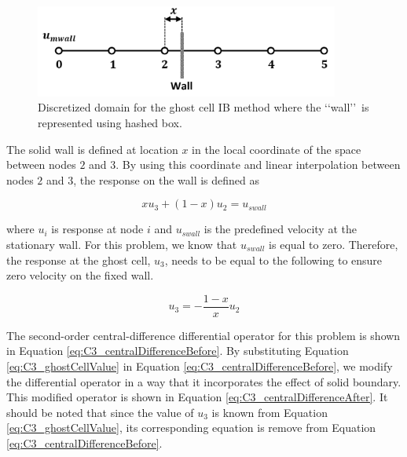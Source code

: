 \begin{figure}[H]
	\centering
	\includegraphics[width=10.00cm]{Chapter_3/figure/ghost_cell_discretization.png}
	\caption{Discretized domain for the ghost cell IB method where the \lq\lq wall\rq\rq\ is represented using hashed box.}
	\label{fig:C3_discretizedGhostCell}
\end{figure}

The solid wall is defined at location $x$ in the local coordinate of the space between nodes $2$ and $3$. By using this coordinate and linear interpolation between nodes $2$ and $3$, the response on the wall is defined as

\begin{equation}
	x u_3 + (1 - x) u_2 = u_{swall}
\end{equation}

where $u_i$ is response at node $i$ and $u_{swall}$ is the predefined velocity at the stationary wall. For this problem, we know that $u_{swall}$ is equal to zero. Therefore, the response at the ghost cell, $u_3$, needs to be equal to the following to ensure zero velocity on the fixed wall.

\begin{equation}\label{eq:C3_ghostCellValue}
	u_3 = -\frac{1 - x}{x} u_2
\end{equation}

The second-order central-difference differential operator for this problem is shown in Equation \eqref{eq:C3_centralDifferenceBefore}. By substituting Equation \eqref{eq:C3_ghostCellValue} in Equation \eqref{eq:C3_centralDifferenceBefore}, we modify the differential operator in a way that it incorporates the effect of solid boundary. This modified operator is shown in Equation \eqref{eq:C3_centralDifferenceAfter}. It should be noted that since the value of $u_3$ is known from Equation \eqref{eq:C3_ghostCellValue}, its corresponding equation is remove from Equation \eqref{eq:C3_centralDifferenceBefore}.

